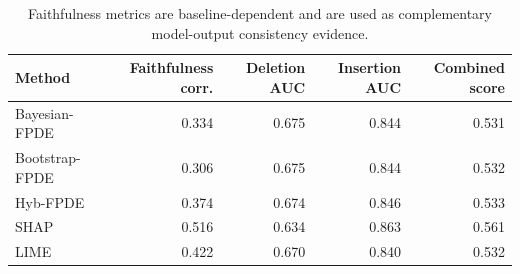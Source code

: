 \begin{table}[t]
\centering
\caption{Faithfulness metrics are baseline-dependent and are used as complementary model-output consistency evidence.}
\label{tab:faithfulness}
\begin{tabular}{l r r r r}
        \hline
        Method & Faithfulness corr. & Deletion AUC & Insertion AUC & Combined score \\
        \hline
        Bayesian-FPDE & 0.334 & 0.675 & 0.844 & 0.531 \\
        Bootstrap-FPDE & 0.306 & 0.675 & 0.844 & 0.532 \\
        Hyb-FPDE & 0.374 & 0.674 & 0.846 & 0.533 \\
        SHAP & 0.516 & 0.634 & 0.863 & 0.561 \\
        LIME & 0.422 & 0.670 & 0.840 & 0.532 \\
        \hline
\end{tabular}
\end{table}
